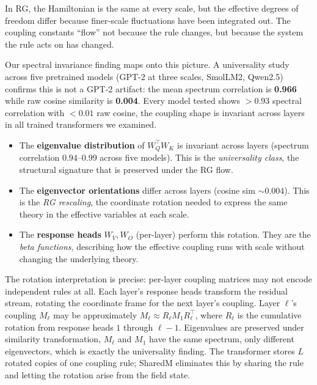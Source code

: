 \documentclass[11pt, a4paper]{article}
\theoremstyle{remark}
\begin{document}
In RG, the Hamiltonian is the same at every scale, but the effective degrees of freedom differ because finer-scale fluctuations have been integrated out.
The coupling constants ``flow'' not because the rule changes, but because the system the rule acts on has changed.

Our spectral invariance finding maps onto this picture.
A universality study across five pretrained models (GPT-2 at three scales, SmolLM2, Qwen2.5) confirms this is not a GPT-2 artifact: the mean spectrum correlation is \textbf{0.966} while raw cosine similarity is \textbf{0.004}.
Every model tested shows $> 0.93$ spectral correlation with $< 0.01$ raw cosine, the coupling shape is invariant across layers in all trained transformers we examined.
\begin{itemize}[nosep]
    \item The \textbf{eigenvalue distribution} of $W_Q^\top W_K$ is invariant across layers (spectrum correlation $0.94$--$0.99$ across five models).
    This is the \emph{universality class}, the structural signature that is preserved under the RG flow.
    \item The \textbf{eigenvector orientations} differ across layers (cosine sim ${\sim}0.004$).
    This is the \emph{RG rescaling}, the coordinate rotation needed to express the same theory in the effective variables at each scale.
    \item The \textbf{response heads} $W_V, W_O$ (per-layer) perform this rotation.
    They are the \emph{beta functions}, describing how the effective coupling runs with scale without changing the underlying theory.
\end{itemize}

The rotation interpretation is precise: per-layer coupling matrices may not encode independent rules at all.
Each layer's response heads transform the residual stream, rotating the coordinate frame for the next layer's coupling.
Layer $\ell$'s coupling $M_\ell$ may be approximately $M_\ell \approx R_\ell M_1 R_\ell^\top$, where $R_\ell$ is the cumulative rotation from response heads $1$ through $\ell{-}1$.
Eigenvalues are preserved under similarity transformation, $M_\ell$ and $M_1$ have the same spectrum, only different eigenvectors, which is exactly the universality finding.
The transformer stores $L$ rotated copies of one coupling rule; SharedM eliminates this by sharing the rule and letting the rotation arise from the field state.
\end{document}
